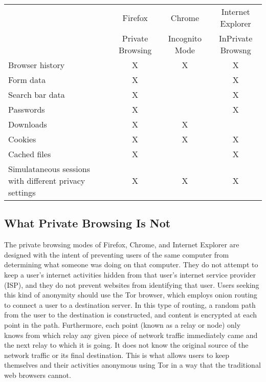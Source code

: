 \documentclass[pdftex,letterpaper,titlepage,12pt]{article}
\begin{document}
    \singlespacing
    \begin{center}
      \begin{tabular}{|p{5cm}|c|c|c|}
        \hline
         & Firefox & Chrome & Internet Explorer \\
         & Private Browsing & Incognito Mode & InPrivate Browsng \\
        \hline
        Browser history & X & X & X \\
        \hline
        Form data & X &  & X \\
        \hline
        Search bar data & X &  & X \\
        \hline
        Passwords & X &  & X \\
        \hline
        Downloads & X & X &  \\
        \hline
        Cookies & X & X & X \\
        \hline
        Cached files & X &  & X \\
        \hline
        Simulataneous sessions with different privacy settings & X & X & X \\
        \hline
      \end{tabular}
    \end{center}
    \doublespacing

    \subsection{What Private Browsing Is Not}
    The private browsing modes of Firefox, Chrome, and Internet Explorer are
    designed with the intent of preventing users of the same computer from
    determining what someone was doing on that computer. They do not attempt
    to keep a user's internet activities hidden from that user's internet
    service provider (ISP), and they do not prevent websites from identifying
    that user.\cite{verdi13}\cite{google13}\cite{ie13} Users seeking this kind 
    of anonymity should use the Tor browser, which employs onion routing to 
    connect a user to a destination server. In this type of routing, a random 
    path from the user to the destination is constructed, and content is 
    encrypted at each point in the path. Furthermore, each point (known as a 
    relay or node) only knows from which relay any given piece of network 
    traffic immediately came and the next relay to which it is going. It does 
    not know the original source of the network traffic or its final 
    destination. This is what allows users to keep themselves and their 
    activities anonymous using Tor in a way that the traditional web browsers 
    cannot.\cite{tor13}
\end{document}
